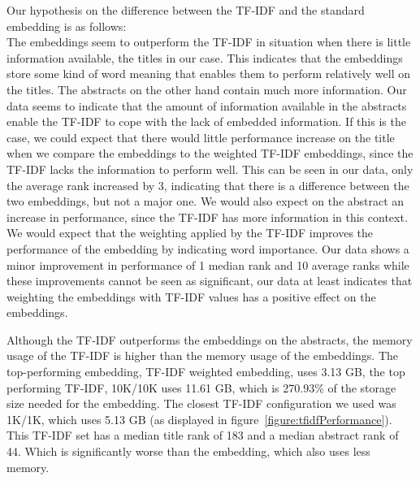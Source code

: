 \documentclass[../../Thesis.tex]{subfiles}
\begin{document}
\begin{jumpin}
Our hypothesis on the difference between the TF-IDF and the standard embedding is as follows:\\
The embeddings seem to outperform the TF-IDF in situation when there is little information available, the titles in our case. This indicates that the embeddings store some kind of word meaning that enables them to perform relatively well on the titles. The abstracts on the other hand contain much more information. Our data seems to indicate that the amount of information available in the abstracts enable the TF-IDF to cope with the lack of embedded information. 
If this is the case, we could expect that there would little performance increase on the title when we compare the embeddings to the weighted TF-IDF embeddings, since the TF-IDF lacks the information to perform well. This can be seen in our data, only the average rank increased by 3, indicating that there is a difference between the two embeddings, but not a major one. We would also expect on the abstract an increase in performance, since the TF-IDF has more information in this context. We would expect that the weighting applied by the TF-IDF improves the performance of the embedding by indicating word importance. Our data shows a minor improvement in performance of 1 median rank and 10 average ranks while these improvements cannot be seen as significant, our data at least indicates that weighting the embeddings with TF-IDF values has a positive effect on the embeddings.

Although the TF-IDF outperforms the embeddings on the abstracts, the memory usage of the TF-IDF is higher than the memory usage of the embeddings. The top-performing embedding, TF-IDF weighted embedding, uses 3.13 GB, the top performing TF-IDF, 10K/10K uses 11.61 GB, which is 270.93\% of the storage size needed for the embedding. The closest TF-IDF configuration we used was 1K/1K, which uses 5.13 GB (as displayed in figure~\ref{figure:tfidfPerformance}). This TF-IDF set has a median title rank of 183 and a median abstract rank of 44. Which is significantly worse than the embedding, which also uses less memory.


\end{jumpin}
\end{document}
